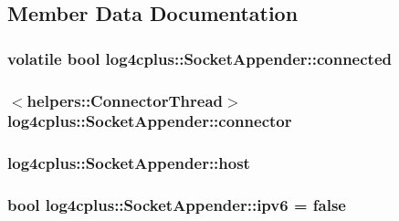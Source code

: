 \subsection{Member Data Documentation}
\hypertarget{classlog4cplus_1_1SocketAppender_afe3a09cb66c1948206291aa45d1a82cc}{
\subsubsection[{connected}]{\setlength{\rightskip}{0pt plus 5cm}volatile bool log4cplus\-::\-Socket\-Appender\-::connected\hspace{0.3cm}{\ttfamily [protected]}}}\label{classlog4cplus_1_1SocketAppender_afe3a09cb66c1948206291aa45d1a82cc}
\hypertarget{classlog4cplus_1_1SocketAppender_aa50560397e03ddeb90e769159edfdf93}{
\subsubsection[{connector}]{$<${\bf helpers\-::\-Connector\-Thread}$>$ log4cplus\-::\-Socket\-Appender\-::connector\hspace{0.3cm}{\ttfamily [protected]}}}\label{classlog4cplus_1_1SocketAppender_aa50560397e03ddeb90e769159edfdf93}
\hypertarget{classlog4cplus_1_1SocketAppender_a6bdd29292be3aeb572d136e808d0012c}{
\subsubsection[{host}]{ log4cplus\-::\-Socket\-Appender\-::host\hspace{0.3cm}{\ttfamily [protected]}}}\label{classlog4cplus_1_1SocketAppender_a6bdd29292be3aeb572d136e808d0012c}
\hypertarget{classlog4cplus_1_1SocketAppender_a4c89e1a58c466826ea6964bbd452539b}{
\subsubsection[{ipv6}]{\setlength{\rightskip}{0pt plus 5cm}bool log4cplus\-::\-Socket\-Appender\-::ipv6 = false\hspace{0.3cm}{\ttfamily [protected]}}}\label{classlog4cplus_1_1SocketAppender_a4c89e1a58c466826ea6964bbd452539b}
